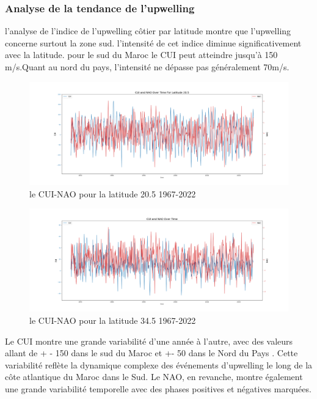 \subsubsection{Analyse de la tendance de l'upwelling}
l'analyse de l'indice de l'upwelling côtier par latitude montre que l'upwelling concerne surtout la zone sud. l'intensité de cet indice diminue significativement avec la latitude. pour le sud du Maroc le CUI peut atteindre jusqu'à 150 m/s.Quant au nord du pays, l'intensité ne dépasse pas généralement 70m/s.

\begin{figure}[H]
\centering
\includegraphics[scale=0.2]{CUI_NAO_20.5.png}
\caption{le CUI-NAO pour la latitude 20.5 1967-2022}
\end{figure}


\begin{figure}[H]
\centering
\includegraphics[scale=0.2]{CUI_NAO_34.5.png}
\caption{le CUI-NAO pour la latitude 34.5 1967-2022}
\end{figure}

Le CUI montre une grande variabilité d'une année à l'autre, avec des valeurs allant de + - 150 dans le sud du Maroc et +- 50 dans le Nord du Pays . Cette variabilité reflète la dynamique complexe des événements d'upwelling le long de la côte atlantique du Maroc dans le Sud. Le NAO, en revanche, montre également une grande variabilité temporelle avec des phases positives et négatives marquées. \\
\vspace{0.5cm}

